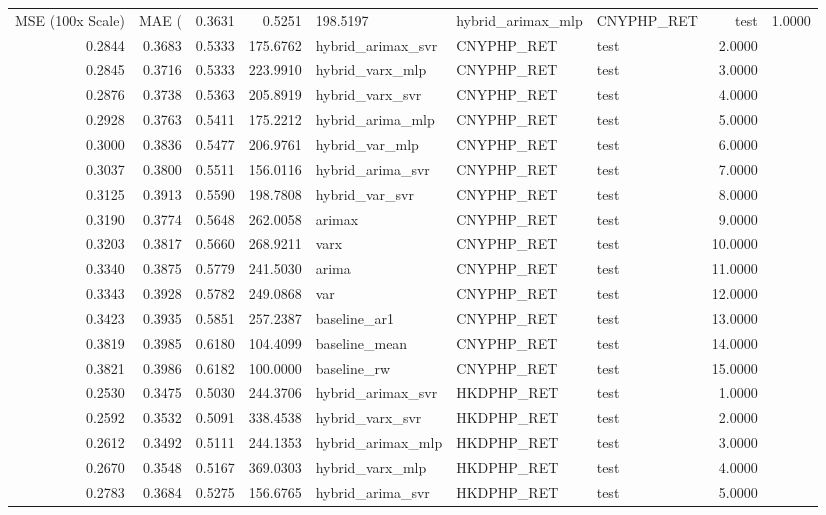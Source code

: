\begin{tabular}{rrrrlllr}
\toprule
MSE (100x Scale) & MAE (%
 & 0.3631 & 0.5251 & 198.5197 & hybrid_arimax_mlp & CNYPHP_RET & test & 1.0000 \\
0.2844 & 0.3683 & 0.5333 & 175.6762 & hybrid_arimax_svr & CNYPHP_RET & test & 2.0000 \\
0.2845 & 0.3716 & 0.5333 & 223.9910 & hybrid_varx_mlp & CNYPHP_RET & test & 3.0000 \\
0.2876 & 0.3738 & 0.5363 & 205.8919 & hybrid_varx_svr & CNYPHP_RET & test & 4.0000 \\
0.2928 & 0.3763 & 0.5411 & 175.2212 & hybrid_arima_mlp & CNYPHP_RET & test & 5.0000 \\
0.3000 & 0.3836 & 0.5477 & 206.9761 & hybrid_var_mlp & CNYPHP_RET & test & 6.0000 \\
0.3037 & 0.3800 & 0.5511 & 156.0116 & hybrid_arima_svr & CNYPHP_RET & test & 7.0000 \\
0.3125 & 0.3913 & 0.5590 & 198.7808 & hybrid_var_svr & CNYPHP_RET & test & 8.0000 \\
0.3190 & 0.3774 & 0.5648 & 262.0058 & arimax & CNYPHP_RET & test & 9.0000 \\
0.3203 & 0.3817 & 0.5660 & 268.9211 & varx & CNYPHP_RET & test & 10.0000 \\
0.3340 & 0.3875 & 0.5779 & 241.5030 & arima & CNYPHP_RET & test & 11.0000 \\
0.3343 & 0.3928 & 0.5782 & 249.0868 & var & CNYPHP_RET & test & 12.0000 \\
0.3423 & 0.3935 & 0.5851 & 257.2387 & baseline_ar1 & CNYPHP_RET & test & 13.0000 \\
0.3819 & 0.3985 & 0.6180 & 104.4099 & baseline_mean & CNYPHP_RET & test & 14.0000 \\
0.3821 & 0.3986 & 0.6182 & 100.0000 & baseline_rw & CNYPHP_RET & test & 15.0000 \\
0.2530 & 0.3475 & 0.5030 & 244.3706 & hybrid_arimax_svr & HKDPHP_RET & test & 1.0000 \\
0.2592 & 0.3532 & 0.5091 & 338.4538 & hybrid_varx_svr & HKDPHP_RET & test & 2.0000 \\
0.2612 & 0.3492 & 0.5111 & 244.1353 & hybrid_arimax_mlp & HKDPHP_RET & test & 3.0000 \\
0.2670 & 0.3548 & 0.5167 & 369.0303 & hybrid_varx_mlp & HKDPHP_RET & test & 4.0000 \\
0.2783 & 0.3684 & 0.5275 & 156.6765 & hybrid_arima_svr & HKDPHP_RET & test & 5.0000 \\

\end{tabular}
